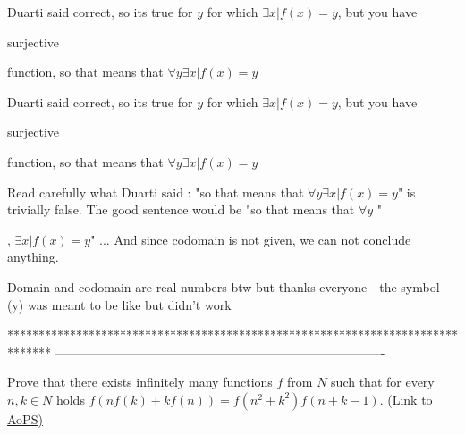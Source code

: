 \begin{solution}
	Duarti said correct, so its true for $y$ for which $\exists x | f(x) = y$, but you have \begin{bolded}surjective\end{bolded} function, so that means that $\forall y \exists x|f(x) = y$
\end{solution}



\begin{solution}
	\begin{tcolorbox}Duarti said correct, so its true for $y$ for which $\exists x | f(x) = y$, but you have \begin{bolded}surjective\end{bolded} function, so that means that $\forall y \exists x|f(x) = y$\end{tcolorbox}

Read carefully what Duarti said : "so that means that $\forall y \exists x|f(x) = y$" is trivially false. The good sentence would be "so that means that $\forall y$ ", $\exists x|f(x) = y$" ...
And since codomain is not given, we can not conclude anything.
\end{solution}



\begin{solution}
	Domain and codomain are real numbers btw but thanks everyone - the symbol (y) was meant to be like but didn't work
\end{solution}
*******************************************************************************
-------------------------------------------------------------------------------

\begin{problem}
	Prove that there exists infinitely many functions  $f $ from $N $ such that for every $n,k \in N $ holds
$f (nf (k)+kf (n))=f (n^2+k^2)f (n+k-1) $.
	\flushright \href{https://artofproblemsolving.com/community/c6h1569654}{(Link to AoPS)}
\end{problem}



